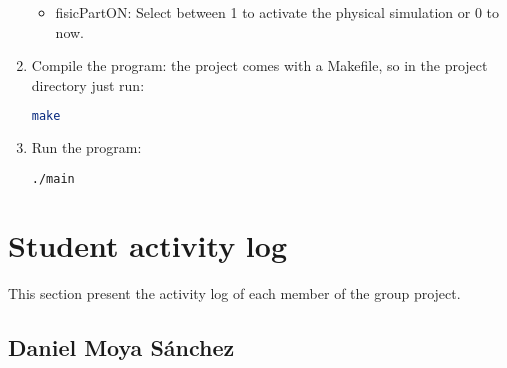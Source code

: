\documentclass[a4paper,9pt]{article}
\begin{document}
\begin{enumerate}
\begin{itemize}
\item fisicPartON: Select between 1 to activate the physical simulation or 0 to now.
\end{itemize}

\item Compile the program: the project comes with a Makefile, so in the project directory just run:
\begin{lstlisting}[language=Bash]
make
\end{lstlisting}

\item Run the program:
\begin{lstlisting}[language=Bash]
./main
\end{lstlisting}
\end{enumerate}

\section{Student activity log}
This section present the activity log of each member of the group project.

\subsection{Daniel Moya Sánchez}
\end{document}

